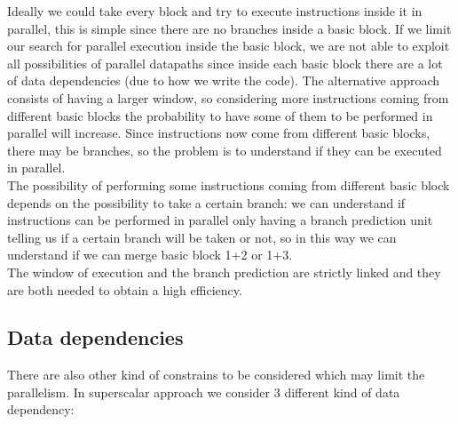 Ideally we could take every block and try to execute instructions inside it in parallel, this is simple since there are no branches inside a basic block. If we limit our search for parallel execution inside the basic block, we are not able to exploit all possibilities of parallel datapaths since inside each basic block there are a lot of data dependencies (due to how we write the code). The alternative approach consists of having a larger window, so considering more instructions coming from different basic blocks the probability to have some of them to be performed in parallel will increase. Since instructions now come from different basic blocks, there may be branches, so the problem is to understand if they can be executed in parallel.\\

The possibility of performing some instructions coming from different basic block depends on the possibility to take a certain branch: we can understand if instructions can be performed in parallel only having a branch prediction unit telling us if a certain branch will be taken or not, so in this way we can understand if we can merge basic block 1+2 or 1+3. \\

The window of execution and the branch prediction are strictly linked and they are both needed to obtain a high efficiency.

\subsection{Data dependencies}
There are also other kind of constrains to be considered which may limit the parallelism. In superscalar approach we consider 3 different kind of data dependency:

